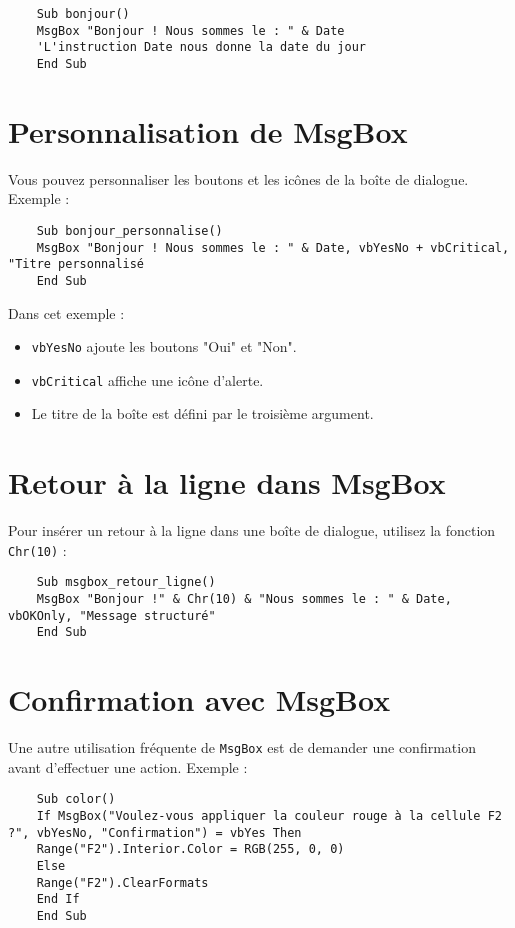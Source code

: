 \documentclass[a4paper,12pt]{report}
\begin{document}
\begin{lstlisting}
	Sub bonjour()
	MsgBox "Bonjour ! Nous sommes le : " & Date
	'L'instruction Date nous donne la date du jour
	End Sub
\end{lstlisting}

\section{Personnalisation de MsgBox}
Vous pouvez personnaliser les boutons et les icônes de la boîte de dialogue. Exemple :

\begin{lstlisting}
	Sub bonjour_personnalise()
	MsgBox "Bonjour ! Nous sommes le : " & Date, vbYesNo + vbCritical, "Titre personnalisé
	End Sub
\end{lstlisting}

Dans cet exemple :
\begin{itemize}
	\item \texttt{vbYesNo} ajoute les boutons "Oui" et "Non".
	\item \texttt{vbCritical} affiche une icône d'alerte.
	\item Le titre de la boîte est défini par le troisième argument.
\end{itemize}

\section{Retour à la ligne dans MsgBox}
Pour insérer un retour à la ligne dans une boîte de dialogue, utilisez la fonction \texttt{Chr(10)} :

\begin{lstlisting}
	Sub msgbox_retour_ligne()
	MsgBox "Bonjour !" & Chr(10) & "Nous sommes le : " & Date, vbOKOnly, "Message structuré"
	End Sub
\end{lstlisting}

\section{Confirmation avec MsgBox}
Une autre utilisation fréquente de \texttt{MsgBox} est de demander une confirmation avant d'effectuer une action. Exemple :

\begin{lstlisting}
	Sub color()
	If MsgBox("Voulez-vous appliquer la couleur rouge à la cellule F2 ?", vbYesNo, "Confirmation") = vbYes Then
	Range("F2").Interior.Color = RGB(255, 0, 0)
	Else
	Range("F2").ClearFormats
	End If
	End Sub
\end{lstlisting}
\newpage
\end{document}
